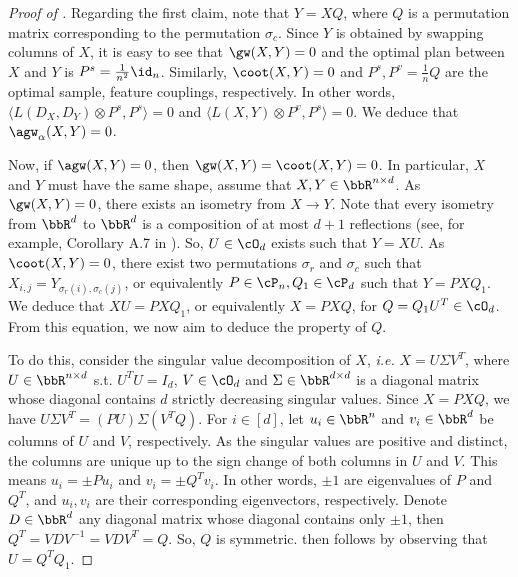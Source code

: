 \begin{proof}[Proof of ]
  Regarding the first claim, note that $Y = X Q$,
  where $Q$ is a permutation matrix corresponding to the permutation $\sigma_c$.
  Since $Y$ is obtained by swapping columns of $X$, it is easy to see that $\gw(X, Y) = 0$
  and the optimal plan between $X$ and $Y$ is $P^s = \frac{1}{n^2} \id_n$.
  Similarly, $\coot(X, Y) = 0$ and $P^s, P^v = \frac{1}{n}Q$ are the optimal sample,
  feature couplings, respectively. In other words,
  $\langle L(D_{X},D_{Y})\otimes P^s, P^s \rangle = 0$ and
  $\langle L(X,Y) \otimes P^v, P^s \rangle = 0$. We deduce that $\agw_{\alpha}(X, Y) = 0$.

  Now, if $\agw(X, Y) = 0$, then $\gw(X, Y) = \coot(X, Y) = 0$. In particular,
  $X$ and $Y$ must have the same shape, assume that $X, Y \in \bbR^{n \times d}$.
  As $\gw(X, Y) = 0$, there exists an isometry from $X \to Y$. Note that every isometry from
  $\bbR^d$ to $\bbR^d$ is a composition of at most $d+1$ reflections
  (see, for example, Corollary A.7 in \citep{Konrad}). So, $U \in \cO_d$
  exists such that $Y = X U$. As $\coot(X, Y) = 0$, there exist two permutations
  $\sigma_r$ and $\sigma_c$ such that $X_{i, j} = Y_{\sigma_r(i), \sigma_c(j)}$,
  or equivalently $P \in \cP_n, Q_1 \in \cP_d$ such that $Y = P X Q_1$.
  We deduce that $X U = P X Q_1$, or equivalently $X = P X Q$, for
  $Q = Q_1 U^T \in \cO_d$. From this equation, we now aim to deduce the property of $Q$.

  To do this, consider the singular value decomposition of $X$, \textit{\textit{i.e.}}
  $X = U \Sigma V^T$, where $U \in \bbR^{n \times d}$ s.t. $U^T U = I_d$,
  $V \in \cO_d$ and $\Sigma \in \bbR^{d \times d}$ is a diagonal matrix
  whose diagonal contains $d$ strictly decreasing singular values. Since $X = P X Q$,
  we have $U \Sigma V^T = (PU) \Sigma (V^T Q)$. For $i \in [d]$, let $u_i \in \bbR^n$
  and $v_i \in \bbR^d$ be columns of $U$ and $V$, respectively.
  As the singular values are positive and distinct, the columns are unique up to
  the sign change of both columns in $U$ and $V$. This means $u_i = \pm Pu_i$ and
  $v_i = \pm Q^T v_i$. In other words, $\pm 1$ are eigenvalues of $P$ and $Q^T$, and
  $u_i, v_i$ are their corresponding eigenvectors, respectively. Denote $D \in \bbR^d$
  any diagonal matrix whose diagonal contains only $\pm 1$, then $Q^T = V D V^{-1} = V D V^T = Q$.
  So, $Q$ is symmetric.  then follows by observing that $U = Q^T Q_1$.
  \end{proof}


